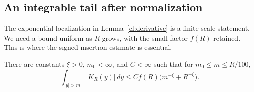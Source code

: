 \subsection{An integrable tail after normalization}

The exponential localization in Lemma~\ref{cl:derivative} is a
finite-scale statement. We need a bound uniform as $R$ grows, with
the small factor $f(R)$ retained. This is where the signed insertion
estimate is essential.

\begin{lemma}\label{cl:tail}
There are constants $\xi>0$, $m_0<\infty$, and $C<\infty$ such that
for $m_0\le m\le R/100$,
\begin{equation}\label{cl:tail-eq}
 \int_{|y|>m}|K_R(y)|\,dy
 \le C f(R)\bigl(m^{-\xi}+R^{-\xi}\bigr).
\end{equation}
\end{lemma}

